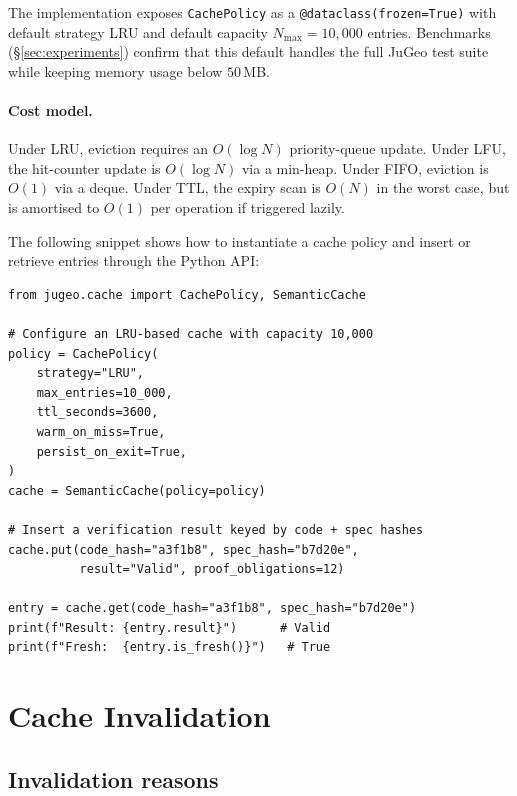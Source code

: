 \documentclass[11pt]{article}
\newcommand{\LRU}{\textsc{LRU}}                    %
\newcommand{\LFU}{\textsc{LFU}}                    %
\newcommand{\FIFO}{\textsc{FIFO}}                  %
\newcommand{\TTL}{\textsc{TTL}}                    %
\begin{document}
The implementation exposes \texttt{CachePolicy} as a
\texttt{@dataclass(frozen=True)} with default strategy \LRU{} and
default capacity $N_{\max} = 10{,}000$ entries.  Benchmarks
(\S\ref{sec:experiments}) confirm that this default handles the
full JuGeo test suite while keeping memory usage below $50$\,MB.

\paragraph{Cost model.}
Under \LRU{}, eviction requires an $O(\log N)$ priority-queue update.
Under \LFU{}, the hit-counter update is $O(\log N)$ via a min-heap.
Under \FIFO{}, eviction is $O(1)$ via a deque.  Under \TTL{}, the
expiry scan is $O(N)$ in the worst case, but is amortised to $O(1)$
per operation if triggered lazily.

The following snippet shows how to instantiate a cache policy and
insert or retrieve entries through the Python API:

\begin{lstlisting}[style=jugeo-python,
  caption={Configuring a semantic cache policy and querying cached
           verification results.},
  label={lst:cache-policy-api}]
from jugeo.cache import CachePolicy, SemanticCache

# Configure an LRU-based cache with capacity 10,000
policy = CachePolicy(
    strategy="LRU",
    max_entries=10_000,
    ttl_seconds=3600,
    warm_on_miss=True,
    persist_on_exit=True,
)
cache = SemanticCache(policy=policy)

# Insert a verification result keyed by code + spec hashes
cache.put(code_hash="a3f1b8", spec_hash="b7d20e",
          result="Valid", proof_obligations=12)

entry = cache.get(code_hash="a3f1b8", spec_hash="b7d20e")
print(f"Result: {entry.result}")      # Valid
print(f"Fresh:  {entry.is_fresh()}")   # True
\end{lstlisting}

\section{Cache Invalidation}\label{sec:invalidation}

\subsection{Invalidation reasons}
\end{document}
